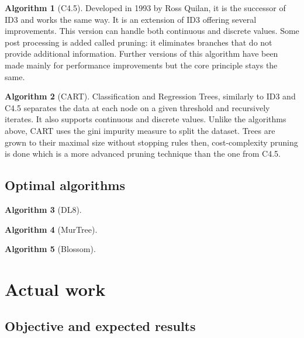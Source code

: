 \documentclass[12pt]{report}
\theoremstyle{definition}
\theoremstyle{definition}
\newtheorem*{algo}{Algorithm}
\theoremstyle{definition}
\begin{document}
\begin{algo}[C4.5]
    Developed in 1993 by Ross Quilan, it is the successor of ID3 and works the same way. It is an extension
    of ID3 offering several improvements. This version can handle both continuous and discrete values.
    Some post processing is added called pruning: it eliminates branches that do not provide additional
    information. Further versions of this algorithm have been made mainly for performance improvements but
    the core principle stays the same.
\end{algo}

\begin{algo}[CART]
    Classification and Regression Trees, similarly to ID3 and C4.5 separates the data at each node on a given
    threshold and recursively iterates. It also supports continuous and discrete values. Unlike the algorithms
    above, CART uses the gini impurity measure to split the dataset. Trees are grown to their maximal size
    without stopping rules then, cost-complexity pruning is done which is a more advanced pruning technique
    than the one from C4.5.
\end{algo}

\section{Optimal algorithms}
\begin{algo}[DL8]
\end {algo}

\begin{algo}[MurTree]
\end {algo}

\begin{algo}[Blossom]
\end {algo}


\chapter{Actual work}
\section{Objective and expected results}
\end{document}
